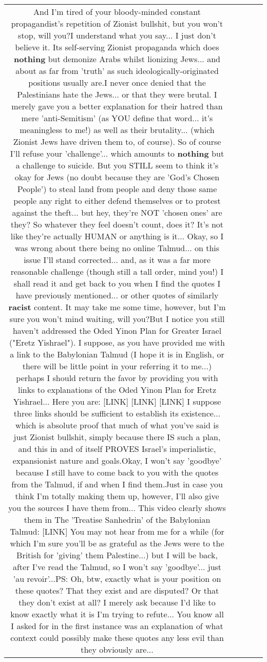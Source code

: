 \documentclass[11pt]{article}
\newlength\mylength
\begin{document}
\begin{center}
\begin{longtable}{|C{.65\mylength}|C{.30\mylength}|C{.12\mylength}|C{.12\mylength}|C{.12\mylength}|}
  \small And I'm tired of your bloody-minded constant propagandist's repetition of Zionist bullshit, but you won't stop, will you?I understand what you say... I just don't believe it. Its self-serving Zionist propaganda which does \textbf{nothing} but demonize Arabs whilst lionizing Jews... and about as far from 'truth' as such ideologically-originated positions usually are.I never once denied that the Palestinians hate the Jews... or that they were brutal. I merely gave you a better explanation for their hatred than mere 'anti-Semitism' (as YOU define that word... it's meaningless to me!) as well as their brutality... (which Zionist Jews have driven them to, of course).  So of course I'll refuse your 'challenge'... which amounts to \textbf{nothing} but a challenge to suicide. But you STILL seem to think it's okay for Jews (no doubt because they are 'God's Chosen People') to steal land from people and deny those same people any right to either defend themselves or to protest against the theft... but hey, they're NOT 'chosen ones' are they? So whatever they feel doesn't count, does it? It's not like they're actually HUMAN or anything is it...  Okay, so I was wrong about there being no online Talmud... on this issue I'll stand corrected... and, as it was a far more reasonable challenge (though still a tall order, mind you!) I shall read it and get back to you when I find the quotes I have previously mentioned... or other quotes of similarly \textbf{racist} content. It may take me some time, however, but I'm sure you won't mind waiting, will you?But I notice you still haven't addressed the Oded Yinon Plan for Greater Israel ("Eretz Yishrael"). I suppose, as you have provided me with a link to the Babylonian Talmud (I hope it is in English, or there will be little point in your referring it to me...) perhaps I should return the favor by providing you with links to explanations of the Oded Yinon Plan for Eretz Yishrael... Here you are: [LINK]  [LINK]  [LINK] I suppose three links should be sufficient to establish its existence... which is absolute proof that much of what you've said is just Zionist bullshit, simply because there IS such a plan, and this in and of itself PROVES Israel's imperialistic, expansionist nature and goals.Okay, I won't say 'goodbye' because I still have to come back to you with the quotes from the Talmud, if and when I find them.Just in case you think I'm totally making them up, however, I'll also give you the sources I have them from... This video clearly shows them in The 'Treatise Sanhedrin' of the Babylonian Talmud: [LINK] You may not hear from me for a while (for which I'm sure you'll be as grateful as the Jews were to the British for 'giving' them Palestine...) but I will be back, after I've read the Talmud, so I won't say 'goodbye'... just 'au revoir'...PS: Oh, btw, exactly what is your position on these quotes? That they exist and are disputed? Or that they don't exist at all? I merely ask because I'd like to know exactly what it is I'm trying to refute... You know all I asked for in the first instance was an explanation of what context could possibly make these quotes any less evil than they obviously are... 
\end{longtable}
\end{center}
\end{document}

